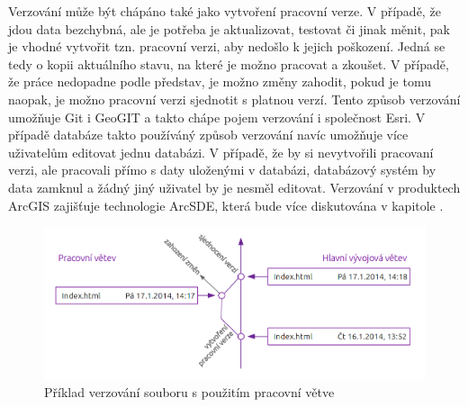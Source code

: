 Verzování může být chápáno také jako vytvoření pracovní verze. V případě, že jdou data bezchybná, ale je potřeba je aktualizovat, testovat či jinak měnit, pak je vhodné vytvořit tzn. pracovní verzi, aby nedošlo k jejich poškození. Jedná se tedy o kopii aktuálního stavu, na které je možno pracovat a zkoušet. V případě, že práce nedopadne podle představ, je možno změny zahodit, pokud je tomu naopak, je možno pracovní verzi sjednotit s platnou verzí. Tento způsob verzování umožňuje Git i GeoGIT a takto chápe pojem verzování i společnost Esri. V případě databáze takto používáný způsob verzování navíc umožňuje více uživatelům editovat jednu databázi. V případě, že by si nevytvořili pracovaní verzi, ale pracovali přímo s daty uloženými v databázi, databázový systém by data zamknul a žádný jiný uživatel by je nesměl editovat. Verzování v produktech ArcGIS zajišťuje technologie ArcSDE, která bude více diskutována v kapitole .

          \begin{figure}[H]
            \centering
            \includegraphics[scale=1]{../../../grafy/obr/schema_verzovaniBranch.png}
            \caption {Příklad verzování souboru s použitím pracovní větve}
          \end{figure}

        

